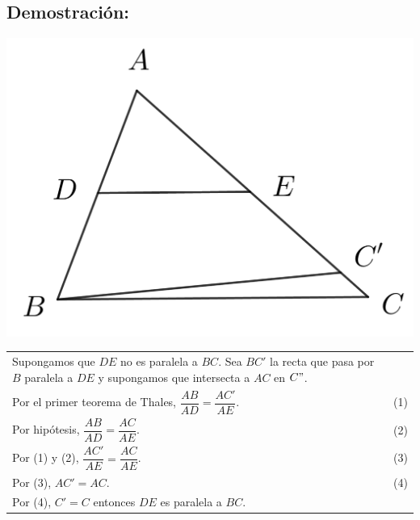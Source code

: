 \documentclass[12pt,a4paper]{article}
\begin{document}
\subsection*{Demostración:} 
\begin{center}
\includegraphics[scale=0.6]{Imagenes/thales1.1.png} 
\end{center}
\begin{tabular}{p{15.9 cm}p{1 cm}}
Supongamos que $DE$ no es paralela a $BC$. Sea $BC'$ la recta que pasa por $B$ paralela a $DE$ y supongamos que intersecta a $AC$ en $C"$.
\\Por el primer teorema de Thales, $\dfrac{AB}{AD}=\dfrac{AC'}{AE}$. & (1)
\\Por hipótesis, $\dfrac{AB}{AD}=\dfrac{AC}{AE}$. & (2) 
\\Por (1) y (2), $\dfrac{AC'}{AE}=\dfrac{AC}{AE}$. &(3)
\\Por (3), $AC'=AC$. & (4) 
\\Por (4), $C'=C$ entonces $DE$ es paralela a $BC$.
\end{tabular}
\end{document}
